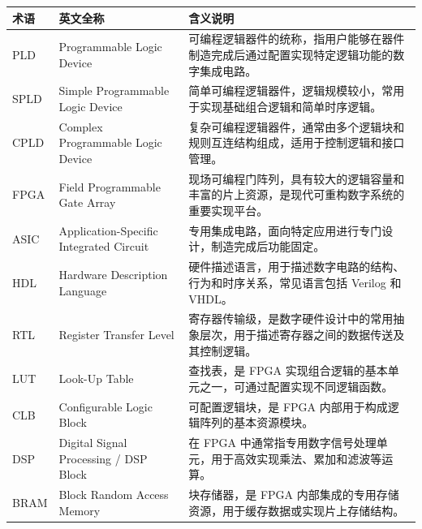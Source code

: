 \begin{longtable}[]{@{}
  >{\raggedright\arraybackslash}p{}
  >{\raggedright\arraybackslash}p{}
  >{\raggedright\arraybackslash}p{}@{}}
\toprule\noalign{}
\begin{minipage}[b]{\linewidth}\raggedright
术语
\end{minipage} & \begin{minipage}[b]{\linewidth}\raggedright
英文全称
\end{minipage} & \begin{minipage}[b]{\linewidth}\raggedright
含义说明
\end{minipage} \\
\midrule\noalign{}
\endhead
\bottomrule\noalign{}
\endlastfoot
PLD & Programmable Logic Device &
可编程逻辑器件的统称，指用户能够在器件制造完成后通过配置实现特定逻辑功能的数字集成电路。 \\
SPLD & Simple Programmable Logic Device &
简单可编程逻辑器件，逻辑规模较小，常用于实现基础组合逻辑和简单时序逻辑。 \\
CPLD & Complex Programmable Logic Device &
复杂可编程逻辑器件，通常由多个逻辑块和规则互连结构组成，适用于控制逻辑和接口管理。 \\
FPGA & Field Programmable Gate Array &
现场可编程门阵列，具有较大的逻辑容量和丰富的片上资源，是现代可重构数字系统的重要实现平台。 \\
ASIC & Application-Specific Integrated Circuit &
专用集成电路，面向特定应用进行专门设计，制造完成后功能固定。 \\
HDL & Hardware Description Language &
硬件描述语言，用于描述数字电路的结构、行为和时序关系，常见语言包括
Verilog 和 VHDL。 \\
RTL & Register Transfer Level &
寄存器传输级，是数字硬件设计中的常用抽象层次，用于描述寄存器之间的数据传送及其控制逻辑。 \\
LUT & Look-Up Table & 查找表，是 FPGA
实现组合逻辑的基本单元之一，可通过配置实现不同逻辑函数。 \\
CLB & Configurable Logic Block & 可配置逻辑块，是 FPGA
内部用于构成逻辑阵列的基本资源模块。 \\
DSP & Digital Signal Processing / DSP Block & 在 FPGA
中通常指专用数字信号处理单元，用于高效实现乘法、累加和滤波等运算。 \\
BRAM & Block Random Access Memory & 块存储器，是 FPGA
内部集成的专用存储资源，用于缓存数据或实现片上存储结构。 \\

\end{longtable}

